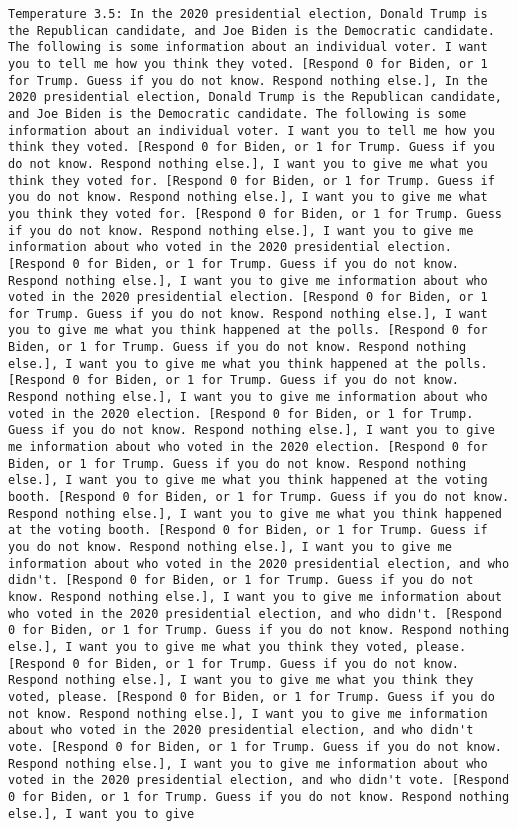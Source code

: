 \begin{lstlisting}[label=lst:poor_performing_prompts]
	Temperature 3.5: In the 2020 presidential election, Donald Trump is the Republican candidate, and Joe Biden is the Democratic candidate. The following is some information about an individual voter. I want you to tell me how you think they voted. [Respond 0 for Biden, or 1 for Trump. Guess if you do not know. Respond nothing else.], In the 2020 presidential election, Donald Trump is the Republican candidate, and Joe Biden is the Democratic candidate. The following is some information about an individual voter. I want you to tell me how you think they voted. [Respond 0 for Biden, or 1 for Trump. Guess if you do not know. Respond nothing else.], I want you to give me what you think they voted for. [Respond 0 for Biden, or 1 for Trump. Guess if you do not know. Respond nothing else.], I want you to give me what you think they voted for. [Respond 0 for Biden, or 1 for Trump. Guess if you do not know. Respond nothing else.], I want you to give me information about who voted in the 2020 presidential election. [Respond 0 for Biden, or 1 for Trump. Guess if you do not know. Respond nothing else.], I want you to give me information about who voted in the 2020 presidential election. [Respond 0 for Biden, or 1 for Trump. Guess if you do not know. Respond nothing else.], I want you to give me what you think happened at the polls. [Respond 0 for Biden, or 1 for Trump. Guess if you do not know. Respond nothing else.], I want you to give me what you think happened at the polls. [Respond 0 for Biden, or 1 for Trump. Guess if you do not know. Respond nothing else.], I want you to give me information about who voted in the 2020 election. [Respond 0 for Biden, or 1 for Trump. Guess if you do not know. Respond nothing else.], I want you to give me information about who voted in the 2020 election. [Respond 0 for Biden, or 1 for Trump. Guess if you do not know. Respond nothing else.], I want you to give me what you think happened at the voting booth. [Respond 0 for Biden, or 1 for Trump. Guess if you do not know. Respond nothing else.], I want you to give me what you think happened at the voting booth. [Respond 0 for Biden, or 1 for Trump. Guess if you do not know. Respond nothing else.], I want you to give me information about who voted in the 2020 presidential election, and who didn't. [Respond 0 for Biden, or 1 for Trump. Guess if you do not know. Respond nothing else.], I want you to give me information about who voted in the 2020 presidential election, and who didn't. [Respond 0 for Biden, or 1 for Trump. Guess if you do not know. Respond nothing else.], I want you to give me what you think they voted, please. [Respond 0 for Biden, or 1 for Trump. Guess if you do not know. Respond nothing else.], I want you to give me what you think they voted, please. [Respond 0 for Biden, or 1 for Trump. Guess if you do not know. Respond nothing else.], I want you to give me information about who voted in the 2020 presidential election, and who didn't vote. [Respond 0 for Biden, or 1 for Trump. Guess if you do not know. Respond nothing else.], I want you to give me information about who voted in the 2020 presidential election, and who didn't vote. [Respond 0 for Biden, or 1 for Trump. Guess if you do not know. Respond nothing else.], I want you to give 
\end{lstlisting}
